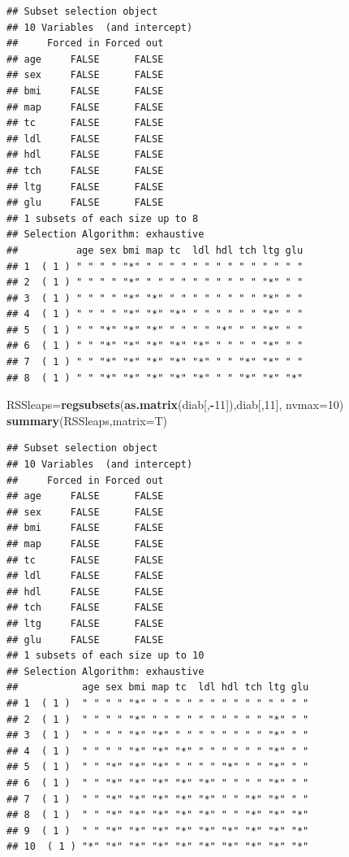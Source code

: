 \documentclass[
]{book}
\newenvironment{Shaded}{\begin{snugshade}}{\end{snugshade}}
\newcommand{\DataTypeTok}[1]{\textcolor[rgb]{0.13,0.29,0.53}{#1}}
\newcommand{\DecValTok}[1]{\textcolor[rgb]{0.00,0.00,0.81}{#1}}
\newcommand{\KeywordTok}[1]{\textcolor[rgb]{0.13,0.29,0.53}{\textbf{#1}}}
\newcommand{\NormalTok}[1]{#1}
\newcommand{\OperatorTok}[1]{\textcolor[rgb]{0.81,0.36,0.00}{\textbf{#1}}}
\begin{document}
\begin{verbatim}
## Subset selection object
## 10 Variables  (and intercept)
##     Forced in Forced out
## age     FALSE      FALSE
## sex     FALSE      FALSE
## bmi     FALSE      FALSE
## map     FALSE      FALSE
## tc      FALSE      FALSE
## ldl     FALSE      FALSE
## hdl     FALSE      FALSE
## tch     FALSE      FALSE
## ltg     FALSE      FALSE
## glu     FALSE      FALSE
## 1 subsets of each size up to 8
## Selection Algorithm: exhaustive
##          age sex bmi map tc  ldl hdl tch ltg glu
## 1  ( 1 ) " " " " "*" " " " " " " " " " " " " " "
## 2  ( 1 ) " " " " "*" " " " " " " " " " " "*" " "
## 3  ( 1 ) " " " " "*" "*" " " " " " " " " "*" " "
## 4  ( 1 ) " " " " "*" "*" "*" " " " " " " "*" " "
## 5  ( 1 ) " " "*" "*" "*" " " " " "*" " " "*" " "
## 6  ( 1 ) " " "*" "*" "*" "*" "*" " " " " "*" " "
## 7  ( 1 ) " " "*" "*" "*" "*" "*" " " "*" "*" " "
## 8  ( 1 ) " " "*" "*" "*" "*" "*" " " "*" "*" "*"
\end{verbatim}

\begin{Shaded}
\begin{Highlighting}[]
\NormalTok{    RSSleaps=}\KeywordTok{regsubsets}\NormalTok{(}\KeywordTok{as.matrix}\NormalTok{(diab[,}\OperatorTok{-}\DecValTok{11}\NormalTok{]),diab[,}\DecValTok{11}\NormalTok{], }\DataTypeTok{nvmax=}\DecValTok{10}\NormalTok{)}
    \KeywordTok{summary}\NormalTok{(RSSleaps,}\DataTypeTok{matrix=}\NormalTok{T)}
\end{Highlighting}
\end{Shaded}

\begin{verbatim}
## Subset selection object
## 10 Variables  (and intercept)
##     Forced in Forced out
## age     FALSE      FALSE
## sex     FALSE      FALSE
## bmi     FALSE      FALSE
## map     FALSE      FALSE
## tc      FALSE      FALSE
## ldl     FALSE      FALSE
## hdl     FALSE      FALSE
## tch     FALSE      FALSE
## ltg     FALSE      FALSE
## glu     FALSE      FALSE
## 1 subsets of each size up to 10
## Selection Algorithm: exhaustive
##           age sex bmi map tc  ldl hdl tch ltg glu
## 1  ( 1 )  " " " " "*" " " " " " " " " " " " " " "
## 2  ( 1 )  " " " " "*" " " " " " " " " " " "*" " "
## 3  ( 1 )  " " " " "*" "*" " " " " " " " " "*" " "
## 4  ( 1 )  " " " " "*" "*" "*" " " " " " " "*" " "
## 5  ( 1 )  " " "*" "*" "*" " " " " "*" " " "*" " "
## 6  ( 1 )  " " "*" "*" "*" "*" "*" " " " " "*" " "
## 7  ( 1 )  " " "*" "*" "*" "*" "*" " " "*" "*" " "
## 8  ( 1 )  " " "*" "*" "*" "*" "*" " " "*" "*" "*"
## 9  ( 1 )  " " "*" "*" "*" "*" "*" "*" "*" "*" "*"
## 10  ( 1 ) "*" "*" "*" "*" "*" "*" "*" "*" "*" "*"
\end{verbatim}
\end{document}
